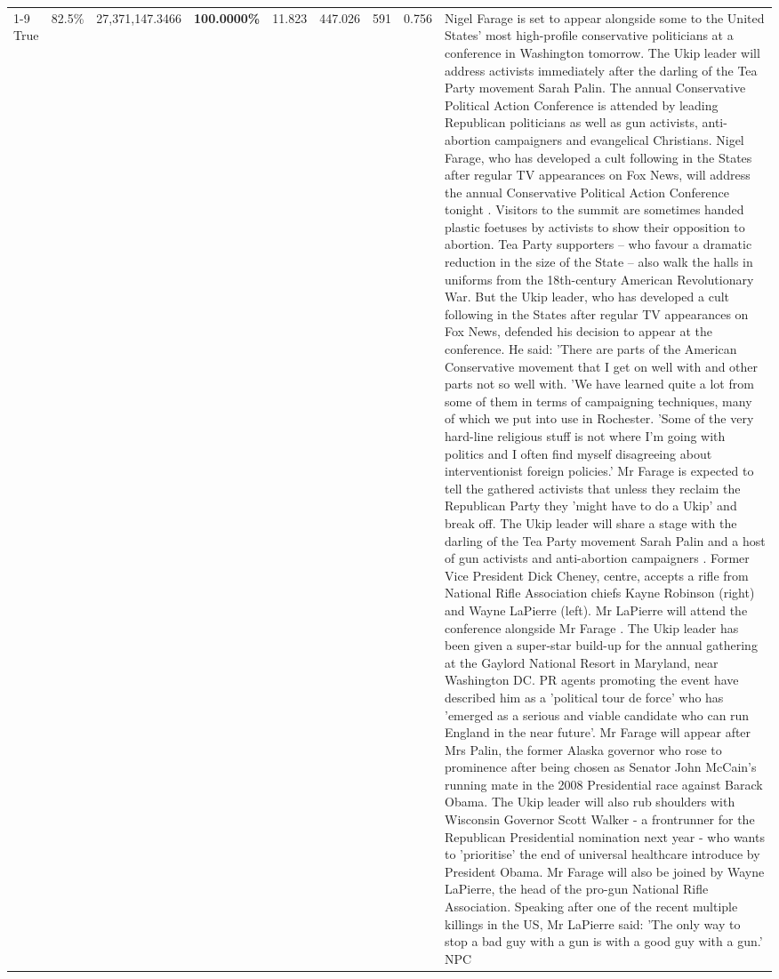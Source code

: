\begin{table}[H]
\begin{tabular}{lllrlllll}
\cline{1-9}
True & 82.5\% & 27,371,147.3466 & \bfseries \color{red} 100.0000\% & 11.823 & 447.026 & 591 & 0.756 & Nigel Farage is set to appear alongside some to the United States' most high-profile conservative politicians at a conference in Washington tomorrow. The Ukip leader will address activists immediately after the darling of the Tea Party movement Sarah Palin. The annual Conservative Political Action Conference is attended by leading Republican politicians as well as gun activists, anti-abortion campaigners and evangelical Christians. Nigel Farage, who has developed a cult following in the States after regular TV appearances on Fox News, will address the annual Conservative Political Action Conference tonight . Visitors to the summit are sometimes handed plastic foetuses by activists to show their opposition to abortion. Tea Party supporters – who favour a dramatic reduction in the size of the State – also walk the halls in uniforms from the 18th-century American Revolutionary War. But the Ukip leader, who has developed a cult following in the States after regular TV appearances on Fox News, defended his decision to appear at the conference. He said: 'There are parts of the American Conservative movement that I get on well with and other parts not so well with. 'We have learned quite a lot from some of them in terms of campaigning techniques, many of which we put into use in Rochester. 'Some of the very hard-line religious stuff is not where I'm going with politics and I often find myself disagreeing about interventionist foreign policies.' Mr Farage is expected to tell the gathered activists that unless they reclaim the Republican Party they 'might have to do a Ukip' and break off. The Ukip leader will share a stage with the darling of the Tea Party movement Sarah Palin and a host of gun activists and anti-abortion campaigners . Former Vice President Dick Cheney, centre, accepts a rifle from National Rifle Association chiefs Kayne Robinson (right) and Wayne LaPierre (left). Mr LaPierre will attend the conference alongside Mr Farage . The Ukip leader has been given a super-star build-up for the annual gathering at the Gaylord National Resort in Maryland, near Washington DC. PR agents promoting the event have described him as a 'political tour de force' who has 'emerged as a serious and viable candidate who can run England in the near future'. Mr Farage will appear after Mrs Palin, the former Alaska governor who rose to prominence after being chosen as Senator John McCain's running mate in the 2008 Presidential race against Barack Obama. The Ukip leader will also rub shoulders with Wisconsin Governor Scott Walker - a frontrunner for the Republican Presidential nomination next year - who wants to 'prioritise' the end of universal healthcare introduce by President Obama. Mr Farage will also be joined by Wayne LaPierre, the head of the pro-gun National Rifle Association. Speaking after one of the recent multiple killings in the US, Mr LaPierre said: 'The only way to stop a bad guy with a gun is with a good guy with a gun.' NPC \\

\end{tabular}
\end{table}
